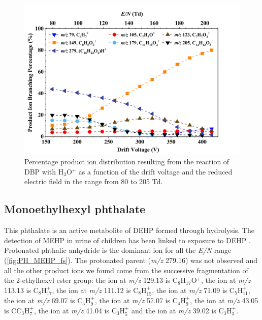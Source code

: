 \begin{figure}[htbp]
\centering
\includegraphics[height=0.4\textheight]{pics/DBP-BR.png}
\caption{Percentage product ion distribution resulting from the reaction of DBP with H$_3$O$^+$ as a function of the drift voltage and the reduced electric field in the range from 80 to 205 Td.}
\label{fig:PH_DBP_fs}
\end{figure}




\subsection{Monoethylhexyl phthalate}


This phthalate is an active metabolite of DEHP formed through hydrolysis. The detection of MEHP in urine of children has been linked to exposure to DEHP \cite{becker2004dehp}.
Protonated phthalic anhydride is the dominant ion for all the \textit{E/N} range (\autoref{fig:PH_MEHP_fs}). 
The protonated parent (\textit{m/z} 279.16) was not observed and all the other product ions we found come from the successive fragmentation of the 2-ethylhexyl ester group:
the ion at \textit{m/z} 129.13 is C$_8$H$_{17}$O$^+$,
the ion at \textit{m/z} 113.13 is C$_8$H$_{17}^+$,
the ion at \textit{m/z} 111.12 is C$_8$H$_{15}^+$,  
the ion at \textit{m/z} 71.09 is C$_5$H$_{11}^+$,
the ion at \textit{m/z} 69.07 is C$_5$H$_9^+$,
the ion at \textit{m/z} 57.07 is C$_4$H$_9^+$, 
the ion at \textit{m/z} 43.05 is CC$_3$H$_7^+$,
the ion at \textit{m/z} 41.04 is C$_3$H$_5^+$
and
the ion at \textit{m/z} 39.02 is C$_3$H$_3^+$. 

